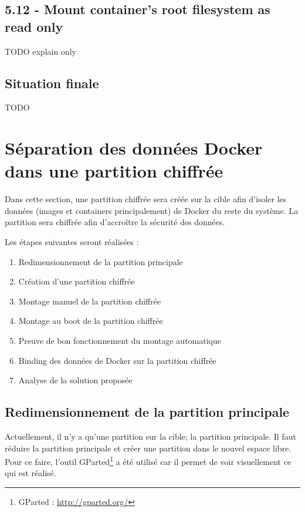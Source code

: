 \documentclass[11pt,a4paper,oneside]{report}
\begin{document}
\subsection{5.12 - Mount container's root filesystem as read only}
TODO explain only


\subsection{Situation finale}
TODO


\section{Séparation des données Docker dans une partition chiffrée}\label{partition_chiffree}
Dans cette section, une partition chiffrée sera créée sur la cible afin d'isoler les données (images et containers principalement) de Docker du reste du système. La partition sera chiffrée afin d'accroître la sécurité des données.

Les étapes suivantes seront réalisées :
\begin{enumerate}
\item Redimensionnement de la partition principale
\item Création d'une partition chiffrée
\item Montage manuel de la partition chiffrée
\item Montage au boot de la partition chiffrée
\item Preuve de bon fonctionnement du montage automatique
\item Binding des données de Docker sur la partition chiffrée
\item Analyse de la solution proposée
\end{enumerate}

\subsection{Redimensionnement de la partition principale}
Actuellement, il n'y a qu'une partition sur la cible; la partition principale. Il faut réduire la partition principale et créer une partition dans le nouvel espace libre. Pour ce faire, l'outil GParted\footnote{GParted : \url{http://gparted.org/}} a été utilisé car il permet de voir visuellement ce qui est réalisé.
\end{document}
